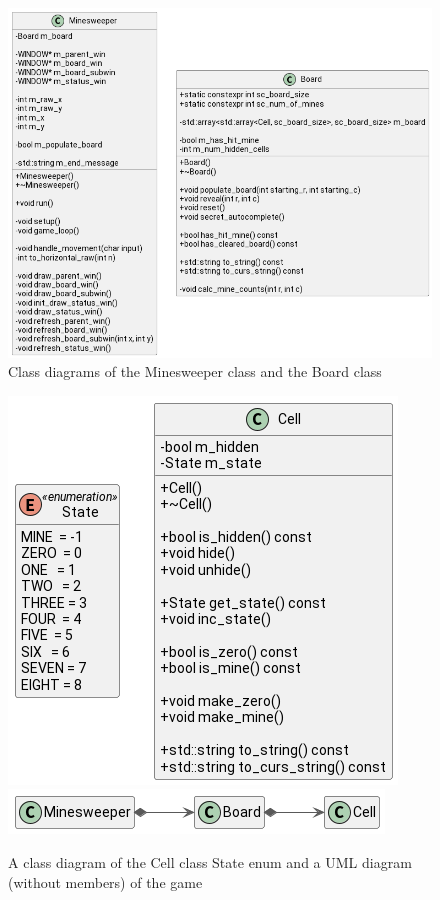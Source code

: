 \documentclass[12pt]{article}
\begin{document}
\begin{figure}[H]
    \centering
    \includegraphics[width=17cm]{minesweeper-uml/minesweeper-and-board.png}
    \caption{Class diagrams of the Minesweeper class and the Board class}
\end{figure}

\begin{figure}[H]
    \centering
    \includegraphics{minesweeper-uml/cell.png}
    \includegraphics{minesweeper-uml/relations.png}
    \caption{A class diagram of the Cell class State enum and a
    UML diagram (without members) of the game}
\end{figure}
\end{document}
